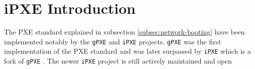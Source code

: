 \documentclass[../main.tex]{subfiles}
\begin{document}
\section{iPXE Introduction}
\label{sec:ipxe-introduction}

The PXE standard explained in subsection \ref{subsec:network-booting} have been implemented notably
by the \texttt{gPXE} and \texttt{iPXE} projects. \texttt{gPXE} was the first implementation of the PXE standard
and was later surpassed by \texttt{iPXE} which is a fork of \texttt{gPXE} \cite{ipxe_vs_gpxe}.
The newer \texttt{iPXE} project is still actively maintained and open
\end{document}
